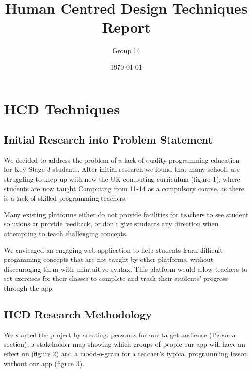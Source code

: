 \documentclass[a4wide, 11pt]{article}
\title{\vspace{-2.0cm}Human Centred Design Techniques Report}
\author{\vspace{-2.0cm}Group 14}
\date{\vspace{-2.0cm}\today}         %
\begin{document}
\maketitle            %


\section{HCD Techniques}

\subsection{Initial Research into Problem Statement}

We decided to address the problem of a lack of quality programming education for Key Stage 3 students. After initial research we found that many schools are struggling to keep up with new the UK computing curriculum (figure 1), where students are now taught Computing from 11-14 as a compulsory course, as there is a lack of skilled programming teachers.

Many existing platforms either do not provide facilities for teachers to see student solutions or provide feedback, or don't give students any direction when attempting to teach challenging concepts.

We envisaged an engaging web application to help students learn difficult progamming concepts that are not taught by other platforms, without discouraging them with unintuitive syntax. This platform would allow teachers to set exercises for their classes to complete and track their students' progress through the app.

\subsection{HCD Research Methodology}

We started the project by creating: personas for our target audience (Persona section), a stakeholder map showing which groups of people our app will have an effect on (figure 2) and a mood-o-gram for a teacher's typical programming lesson without our app (figure 3).
\end{document}
